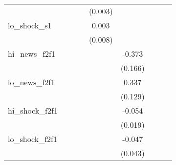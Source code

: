 {\begin{tabular}{l*{8}{c}}
            &                     &                     &                     &     (0.003)         &                     &                     &                     &                     \\
\addlinespace
lo\_shock\_s1 &                     &                     &                     &       0.003         &                     &                     &                     &                     \\
            &                     &                     &                     &     (0.008)         &                     &                     &                     &                     \\
\addlinespace
hi\_news\_f2f1&                     &                     &                     &                     &      -0.373\sym{**} &                     &                     &                     \\
            &                     &                     &                     &                     &     (0.166)         &                     &                     &                     \\
\addlinespace
lo\_news\_f2f1&                     &                     &                     &                     &       0.337\sym{**} &                     &                     &                     \\
            &                     &                     &                     &                     &     (0.129)         &                     &                     &                     \\
\addlinespace
hi\_shock\_f2f1&                     &                     &                     &                     &      -0.054\sym{***}&                     &                     &                     \\
            &                     &                     &                     &                     &     (0.019)         &                     &                     &                     \\
\addlinespace
lo\_shock\_f2f1&                     &                     &                     &                     &      -0.047         &                     &                     &                     \\
            &                     &                     &                     &                     &     (0.043)         &                     &                     &                     \\

\end{tabular}}
